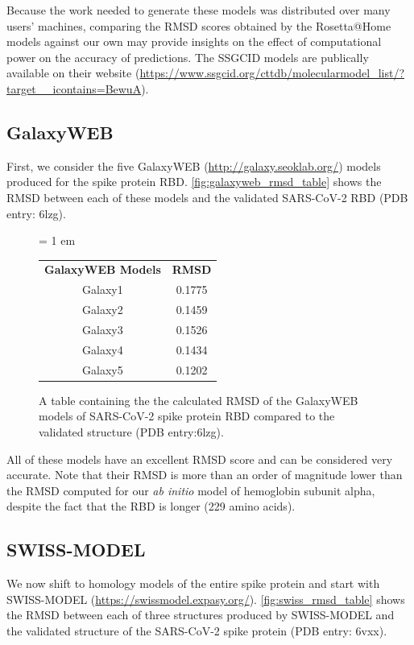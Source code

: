 {{Because the work needed to generate these models was distributed over many users' machines, comparing the RMSD scores obtained by the Rosetta@Home models against our own may provide insights on the effect of computational power on the accuracy of predictions. The SSGCID models are publically available on their website (\url{https://www.ssgcid.org/cttdb/molecularmodel_list/?target__icontains=BewuA}).

\FloatBarrier
{}
\subsection{GalaxyWEB}

First, we consider the five GalaxyWEB (\url{http://galaxy.seoklab.org/}) models produced for the spike protein RBD. \autoref{fig:galaxyweb_rmsd_table} shows the RMSD between each of these models and the validated SARS-CoV-2 RBD (PDB entry: 6lzg).

\begin{figure}[h]
\centering
\tabcolsep = 1 em
\mySfFamily
\begin{tabular}{c c}
\textbf{GalaxyWEB Models} & \textbf{RMSD} \\
Galaxy1 & 0.1775 \\
Galaxy2 & 0.1459 \\
Galaxy3 & 0.1526 \\
Galaxy4 & 0.1434 \\
Galaxy5 & 0.1202 \\
\end{tabular}
\caption{A table containing the the calculated RMSD of the GalaxyWEB models of SARS-CoV-2 spike protein RBD compared to the validated structure (PDB entry:6lzg).}
\label{fig:galaxyweb_rmsd_table}
\end{figure}

All of these models have an excellent RMSD score and can be considered very accurate. Note that their RMSD is more than an order of magnitude lower than the RMSD computed for our \textit{ab initio} model of hemoglobin subunit alpha, despite the fact that the RBD is longer (229 amino acids).

\FloatBarrier
{}
\subsection{SWISS-MODEL}

We now shift to homology models of the entire spike protein and start with SWISS-MODEL (\url{https://swissmodel.expasy.org/}). \autoref{fig:swiss_rmsd_table} shows the RMSD between each of three structures produced by SWISS-MODEL and the validated structure of the SARS-CoV-2 spike protein (PDB entry: 6vxx).

}}
